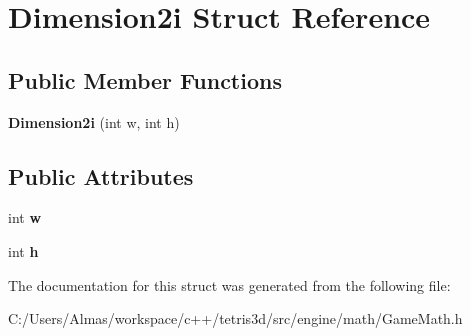 \hypertarget{struct_dimension2i}{\section{Dimension2i Struct Reference}
\label{struct_dimension2i}
}
\subsection*{Public Member Functions}
\begin{DoxyCompactItemize}
\item 
\hypertarget{struct_dimension2i_a293e4b8b8fc320a83bbe48ab5124d243}{{\bfseries Dimension2i} (int w, int h)}\label{struct_dimension2i_a293e4b8b8fc320a83bbe48ab5124d243}

\end{DoxyCompactItemize}
\subsection*{Public Attributes}
\begin{DoxyCompactItemize}
\item 
\hypertarget{struct_dimension2i_a49f44025d2400d00f122f30b7d3c0861}{int {\bfseries w}}\label{struct_dimension2i_a49f44025d2400d00f122f30b7d3c0861}

\item 
\hypertarget{struct_dimension2i_ababfb592557544a399b887c6359059c8}{int {\bfseries h}}\label{struct_dimension2i_ababfb592557544a399b887c6359059c8}

\end{DoxyCompactItemize}


The documentation for this struct was generated from the following file\-:\begin{DoxyCompactItemize}
\item 
C\-:/\-Users/\-Almas/workspace/c++/tetris3d/src/engine/math/Game\-Math.\-h\end{DoxyCompactItemize}
